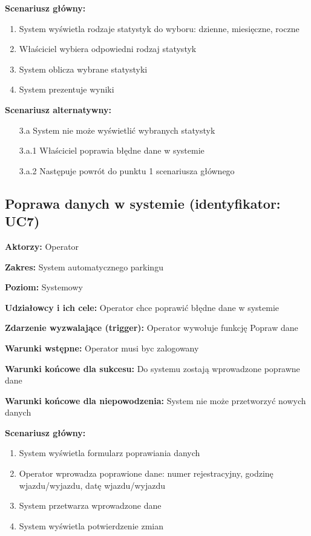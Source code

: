 \hspace{0cm}\textbf{Scenariusz główny: }
\begin{enumerate}
\item System wyświetla rodzaje statystyk do wyboru: dzienne, miesięczne, roczne
\item Właściciel wybiera odpowiedni rodzaj statystyk
\item System oblicza wybrane statystyki
\item System prezentuje wyniki
\end{enumerate}
\hspace{0cm}\textbf{Scenariusz alternatywny: }
\begin{enumerate}
\item[3.a] System nie może wyświetlić wybranych statystyk
\item[3.a.1] Właściciel poprawia błędne dane w systemie
\item[3.a.2] Następuje powrót do punktu 1 scenariusza głównego
\end{enumerate}

\subsection{Poprawa danych w systemie (identyfikator: UC7)}
\textbf{Aktorzy: }Operator

\hspace{0cm}\textbf{Zakres: }System automatycznego parkingu

\hspace{0cm}\textbf{Poziom: }Systemowy

\hspace{0cm}\textbf{Udziałowcy i ich cele: }Operator chce poprawić błędne dane w systemie

\hspace{0cm}\textbf{Zdarzenie wyzwalające (trigger): }Operator wywołuje funkcję Popraw dane

\hspace{0cm}\textbf{Warunki wstępne: }
Operator musi byc zalogowany

\hspace{0cm}\textbf{Warunki końcowe dla sukcesu: }Do systemu zostają wprowadzone poprawne dane

\hspace{0cm}\textbf{Warunki końcowe dla niepowodzenia: }System nie może przetworzyć nowych danych\newline

\hspace{0cm}\textbf{Scenariusz główny: }
\begin{enumerate}
\item System wyświetla formularz poprawiania danych
\item Operator wprowadza poprawione dane: numer rejestracyjny, godzinę wjazdu/wyjazdu, datę wjazdu/wyjazdu
\item System przetwarza wprowadzone dane
\item System wyświetla potwierdzenie zmian
\end{enumerate}

